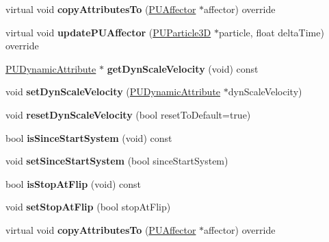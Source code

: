 \begin{DoxyCompactItemize}
\mbox{\label{classPUScaleVelocityAffector_a767f95c6396e97b73238971fc0ebbf4b}} 
virtual void {\bfseries copy\+Attributes\+To} (\hyperlink{classPUAffector}{P\+U\+Affector} $\ast$affector) override
\item 
\mbox{\label{classPUScaleVelocityAffector_add3544641e6c3a93684b4b3806153d09}} 
virtual void {\bfseries update\+P\+U\+Affector} (\hyperlink{structPUParticle3D}{P\+U\+Particle3D} $\ast$particle, float delta\+Time) override
\item 
\mbox{\label{classPUScaleVelocityAffector_a0f1e22cef8b3e15051d324fa2bd20e11}} 
\hyperlink{classPUDynamicAttribute}{P\+U\+Dynamic\+Attribute} $\ast$ {\bfseries get\+Dyn\+Scale\+Velocity} (void) const
\item 
\mbox{\label{classPUScaleVelocityAffector_aaabc878632bc8f8e50c2b6abc604b0a5}} 
void {\bfseries set\+Dyn\+Scale\+Velocity} (\hyperlink{classPUDynamicAttribute}{P\+U\+Dynamic\+Attribute} $\ast$dyn\+Scale\+Velocity)
\item 
\mbox{\label{classPUScaleVelocityAffector_a16c22d74900ea05f8a8985d331d352da}} 
void {\bfseries reset\+Dyn\+Scale\+Velocity} (bool reset\+To\+Default=true)
\item 
\mbox{\label{classPUScaleVelocityAffector_ac21d9b8d912d3a645237541abf429162}} 
bool {\bfseries is\+Since\+Start\+System} (void) const
\item 
\mbox{\label{classPUScaleVelocityAffector_a2ba369ab2f597f70789d3c7db18bbd30}} 
void {\bfseries set\+Since\+Start\+System} (bool since\+Start\+System)
\item 
\mbox{\label{classPUScaleVelocityAffector_abd18792dc888cb5f74aa6248adc13334}} 
bool {\bfseries is\+Stop\+At\+Flip} (void) const
\item 
\mbox{\label{classPUScaleVelocityAffector_ac56c91316a6f09a60b58f3dbab6b78cb}} 
void {\bfseries set\+Stop\+At\+Flip} (bool stop\+At\+Flip)
\item 
\mbox{\label{classPUScaleVelocityAffector_a88dc9b4ae564c3820a5ac38d57aecf3c}} 
virtual void {\bfseries copy\+Attributes\+To} (\hyperlink{classPUAffector}{P\+U\+Affector} $\ast$affector) override
\end{DoxyCompactItemize}
